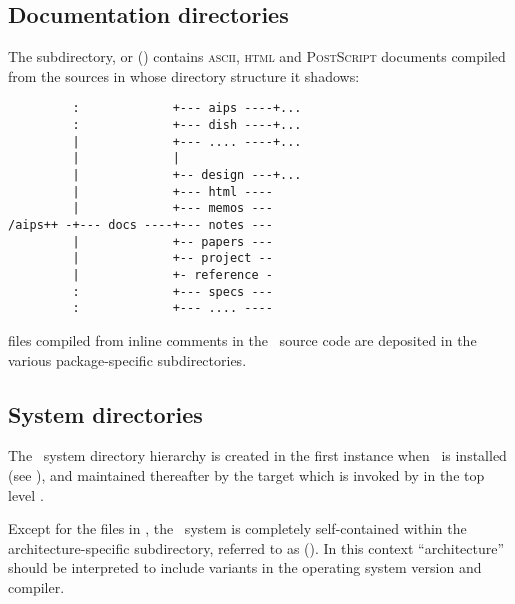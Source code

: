 
\subsection{Documentation directories}
\label{Documentation directories}

The  subdirectory, or  ()
contains \textsc{ascii}, \textsc{html} and \textsc{PostScript} documents
compiled from the sources in  whose directory structure
it shadows:

\begin{verbatim}
         :             +--- aips ----+...
         :             +--- dish ----+...
         |             +--- .... ----+...
         |             |
         |             +-- design ---+...
         |             +--- html ----
         |             +--- memos ---
/aips++ -+--- docs ----+--- notes ---
         |             +-- papers ---
         |             +-- project --
         |             +- reference -
         :             +--- specs ---
         :             +--- .... ----
\end{verbatim}

\noindent
{} files compiled from inline comments in the \cplusplus\ source code
are deposited in the various package-specific subdirectories.


\subsection{System directories}
\label{System directories}

The \aipspp\ system directory hierarchy is created in the first instance when
\aipspp\ is installed (see ), and maintained thereafter by
the  target which is invoked by  in the top level
.

Except for the  files in , the \aipspp\ 
system is completely self-contained within the architecture-specific
subdirectory, referred to as \file{\$AIPSARCH} (\sref{variables}).  In this
context ``architecture'' should be interpreted to include variants in the
operating system version and compiler.

